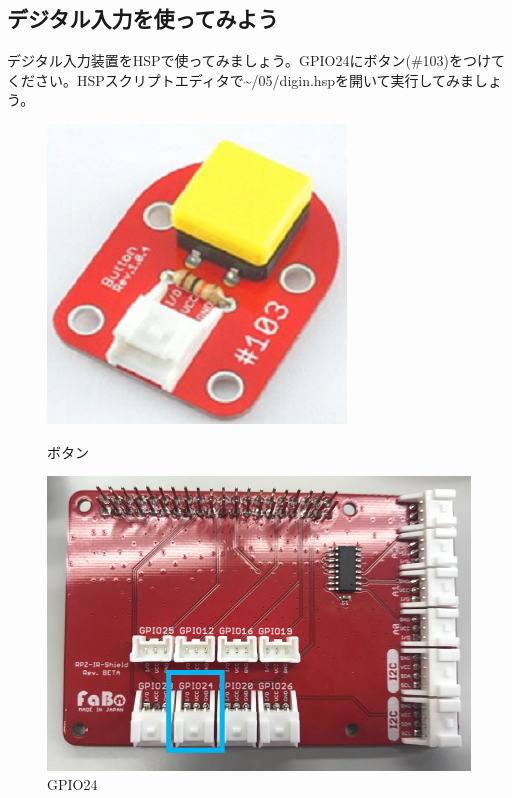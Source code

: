 \subsection{デジタル入力を使ってみよう}
デジタル入力装置をHSPで使ってみましょう。GPIO24にボタン(\#103)をつけてください。HSPスクリプトエディタで\textasciitilde /05/digin.hspを開いて実行してみましょう。\\
\begin{figure}[H]
  \begin{minipage}[t]{0.3\columnwidth}
    \centering
 \includegraphics[width=\linewidth]{images/chap05/text05-img028.png}
    \caption{ボタン}
  \end{minipage}
  \begin{minipage}[t]{0.5\columnwidth}
    \centering
    \includegraphics[width=\linewidth]{images/chap05/text05-img029.png}
    \caption{GPIO24}
  \end{minipage}
\end{figure}

